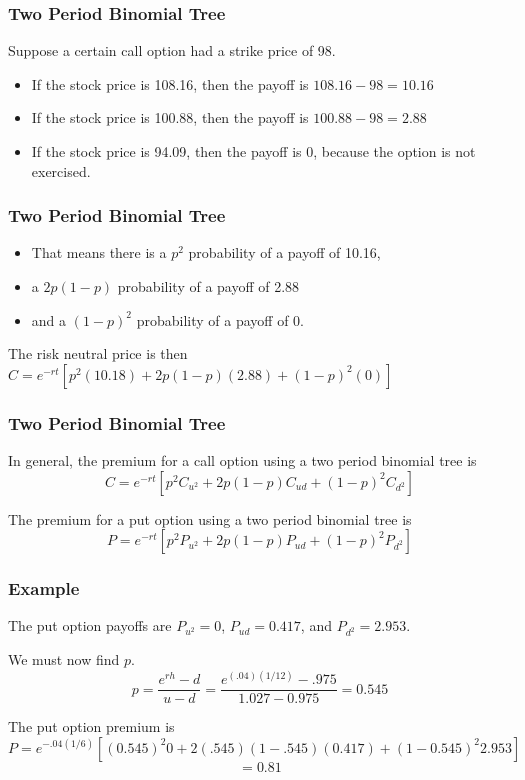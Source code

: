 \documentclass{beamer}
\theoremstyle{plain}
\theoremstyle{definition}
\theoremstyle{remark}
\begin{document}
\begin{frame}
\frametitle{Two Period Binomial Tree}
Suppose a certain call option had a strike price of 98. 
 \begin{itemize}
 \item If the stock price is 108.16, then the payoff is $108.16 - 98 = 10.16$
 \item If the stock price is 100.88, then the payoff is $100.88 - 98 = 2.88$
 \item If the stock price is 94.09, then the payoff is 0, because the option is not exercised.
 \end{itemize}
\end{frame}

\begin{frame}
\frametitle{Two Period Binomial Tree}

 \begin{itemize}
 \item That means there is a $p^2$ probability of a payoff of 10.16,
 \item a $2p(1-p)$ probability of a payoff of 2.88
 \item and a $(1-p)^2$ probability of a payoff of 0. 
 \end{itemize}

The risk neutral price is then $C = e^{-rt}[p^2 (10.18) + 2p(1-p) (2.88) + (1-p)^2 (0)]$

\end{frame}

\begin{frame}
\frametitle{Two Period Binomial Tree}

In general, the premium for a call option using a two period binomial tree is \[C = e^{-rt}[p^2 C_{u^2} + 2p(1-p) C_{ud} + (1-p)^2 C_{d^2}]\]

The premium for a put option using a two period binomial tree is \[P = e^{-rt}[p^2 P_{u^2} + 2p(1-p) P_{ud} + (1-p)^2 P_{d^2}]\]

\end{frame}

\begin{frame}
\frametitle{Example}

The put option payoffs are $P_{u^2} = 0$, $P_{ud} = 0.417$, and $P_{d^2} = 2.953$. 

\vspace{.3 cm} 

We must now find $p$. \[p = \frac{e^{r h} - d}{u-d} = \frac{e^{(.04) (1/12)} - .975}{1.027-0.975} = 0.545\]

\vspace{.3 cm}

The put option premium is  \[P = e^{-.04 (1/6)}[(0.545)^2 0 + 2(.545)(1-.545)(0.417) + (1-0.545)^2 2.953] \]
\[ = 0.81\]

\end{frame}
\end{document}
